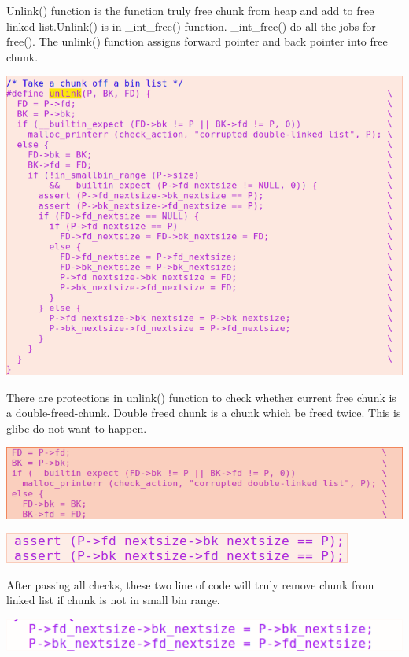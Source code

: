 \documentclass[12pt]{article}
\begin{document}
Unlink() function is the function truly free chunk from heap and add to free linked list.Unlink() is in \_int\_free() function. \_int\_free() do all the jobs for free(). The unlink() function assigns forward pointer and back pointer into free chunk.

\includegraphics[scale=0.5]{unlink.png}

There are protections in unlink() function to check whether current free chunk is a double-freed-chunk. Double freed chunk is a chunk which be freed twice. This is glibc do not want to happen. 

\includegraphics[scale=0.5]{unlink_double_free_check1.png}

\includegraphics[scale=0.5]{unlink_double_free_check2.png}

After passing all checks, these two line of code will truly remove chunk from linked list if chunk is not in small bin range.   

\includegraphics[scale=0.5]{rm_linklist.png}
\end{document}
